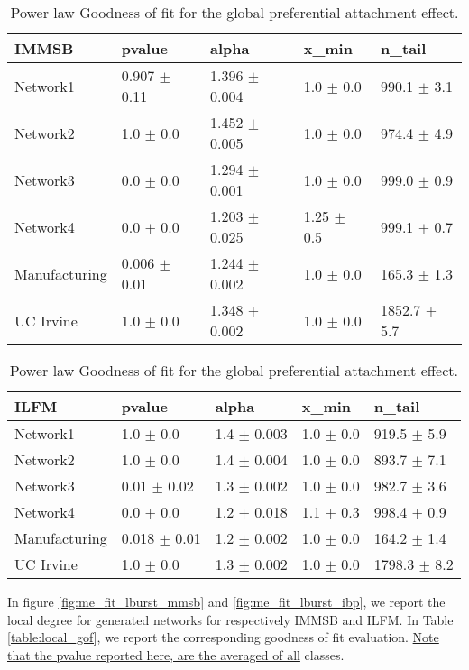 \documentclass[a4paper, 12pt]{article}
\begin{document}
\begin{table}
    \caption{Power law Goodness of fit for the global preferential attachment effect.}
\centering
    \begin{tabular}{lllll}
    \hline
        \textbf{IMMSB} & pvalue          & alpha           & x\_min          & n\_tail           \\
    \hline
    Network1     & 0.907 $\pm$ 0.11 & 1.396 $\pm$ 0.004 & 1.0 $\pm$ 0.0    & 990.1 $\pm$ 3.1  \\
    Network2     & 1.0 $\pm$ 0.0     & 1.452 $\pm$ 0.005 & 1.0 $\pm$ 0.0    & 974.4 $\pm$ 4.9  \\
    Network3     & 0.0 $\pm$ 0.0     & 1.294 $\pm$ 0.001 & 1.0 $\pm$ 0.0    & 999.0 $\pm$ 0.9 \\
    Network4     & 0.0 $\pm$ 0.0     & 1.203 $\pm$ 0.025 & 1.25 $\pm$ 0.5 & 999.1 $\pm$ 0.7 \\
    Manufacturing & 0.006 $\pm$ 0.01 & 1.244 $\pm$ 0.002 & 1.0 $\pm$ 0.0    & 165.3 $\pm$ 1.3 \\
    UC Irvine     & 1.0 $\pm$ 0.0     & 1.348 $\pm$ 0.002 & 1.0 $\pm$ 0.0    & 1852.7 $\pm$ 5.7 \\
    \hline
    \end{tabular}

    \begin{tabular}{lllll}
    \hline
        \textbf{ILFM} & pvalue          & alpha           & x\_min       & n\_tail           \\
    \hline
    Network1     & 1.0 $\pm$ 0.0     & 1.4 $\pm$ 0.003 & 1.0 $\pm$ 0.0 & 919.5 $\pm$ 5.9 \\
    Network2     & 1.0 $\pm$ 0.0     & 1.4 $\pm$ 0.004 & 1.0 $\pm$ 0.0 & 893.7 $\pm$ 7.1  \\
    Network3     & 0.01 $\pm$ 0.02  & 1.3 $\pm$ 0.002 & 1.0 $\pm$ 0.0 & 982.7 $\pm$ 3.6 \\
    Network4     & 0.0 $\pm$ 0.0     & 1.2 $\pm$ 0.018 & 1.1 $\pm$ 0.3 & 998.4 $\pm$ 0.9 \\
    Manufacturing & 0.018 $\pm$ 0.01 & 1.2 $\pm$ 0.002 & 1.0 $\pm$ 0.0 & 164.2 $\pm$ 1.4 \\
    UC Irvine     & 1.0 $\pm$ 0.0     & 1.3 $\pm$ 0.002 & 1.0 $\pm$ 0.0 & 1798.3 $\pm$ 8.2 \\
    \hline
    \end{tabular}
    \label{table:global_gof}
\end{table}



In figure \ref{fig:me_fit_lburst_mmsb} and \ref{fig:me_fit_lburst_ibp}, we report the local degree for generated networks for respectively IMMSB and ILFM. In Table \ref{table:local_gof}, we report the corresponding goodness of fit evaluation. \underline{Note that the pvalue reported here, are the averaged of all} classes.
\end{document}

